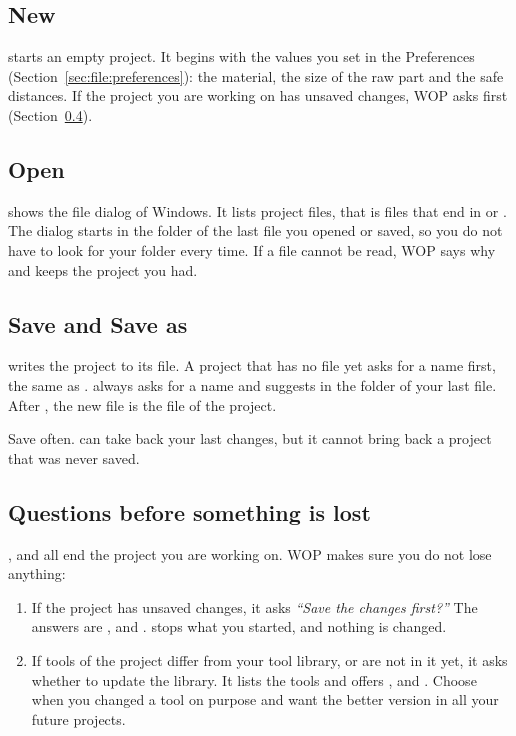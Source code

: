 \subsection{New}
 starts an empty project. It begins with the values you set in the Preferences (Section~\ref{sec:file:preferences}): the material, the size of the raw part and the safe distances. If the project you are working on has unsaved changes, WOP asks first (Section~\ref{sec:file:questions}).

\subsection{Open}
 shows the file dialog of Windows. It lists project files, that is files that end in  or . The dialog starts in the folder of the last file you opened or saved, so you do not have to look for your folder every time. If a file cannot be read, WOP says why and keeps the project you had.

\subsection{Save and Save as}
 writes the project to its file. A project that has no file yet asks for a name first, the same as .  always asks for a name and suggests  in the folder of your last file. After , the new file is the file of the project.

\begin{tipbox}
Save often.  can take back your last changes, but it cannot bring back a project that was never saved.
\end{tipbox}

\subsection{Questions before something is lost}\label{sec:file:questions}
,  and  all end the project you are working on. WOP makes sure you do not lose anything:
\begin{enumerate}
  \item If the project has unsaved changes, it asks \emph{``Save the changes first?''} The answers are ,  and .  stops what you started, and nothing is changed.
  \item If tools of the project differ from your tool library, or are not in it yet, it asks whether to update the library. It lists the tools and offers ,  and . Choose  when you changed a tool on purpose and want the better version in all your future projects.
\end{enumerate}

